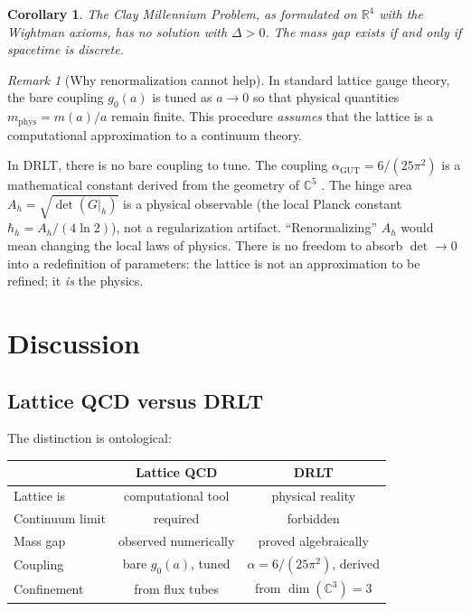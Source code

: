 \documentclass[12pt]{article}
\newtheorem{corollary}[theorem]{Corollary}
\theoremstyle{remark}
\newtheorem{remark}[theorem]{Remark}
\begin{document}
\begin{corollary}
The Clay Millennium Problem, as formulated on $\mathbb{R}^4$ with the
Wightman axioms, has no solution with $\Delta > 0$. The mass gap exists
if and only if spacetime is discrete.
\end{corollary}

\begin{remark}[Why renormalization cannot help]
In standard lattice gauge theory, the bare coupling $g_0(a)$ is tuned as
$a \to 0$ so that physical quantities $m_{\mathrm{phys}} = m(a)/a$
remain finite. This procedure \emph{assumes} that the lattice is a
computational approximation to a continuum theory.

In DRLT, there is no bare coupling to tune. The coupling
$\alpha_{\mathrm{GUT}} = 6/(25\pi^2)$ is a mathematical constant
derived from the geometry of $\mathbb{C}^5$ \cite{DRLT-rep}. The hinge
area $A_h = \sqrt{\det(G|_h)}$ is a physical observable (the local
Planck constant $\hbar_h = A_h/(4\ln 2)$), not a regularization
artifact. ``Renormalizing'' $A_h$ would mean changing the local laws of
physics. There is no freedom to absorb $\det \to 0$ into a redefinition
of parameters: the lattice is not an approximation to be refined; it
\emph{is} the physics.
\end{remark}

\section{Discussion}
\label{sec:discussion}

\subsection{Lattice QCD versus DRLT}

The distinction is ontological:

\begin{center}
\begin{tabular}{lcc}
\hline
& Lattice QCD & DRLT \\
\hline
Lattice is & computational tool & physical reality \\
Continuum limit & required & forbidden \\
Mass gap & observed numerically & proved algebraically \\
Coupling & bare $g_0(a)$, tuned & $\alpha = 6/(25\pi^2)$, derived \\
Confinement & from flux tubes & from $\dim(\mathbb{C}^3) = 3$ \\
\hline
\end{tabular}
\end{center}
\end{document}
